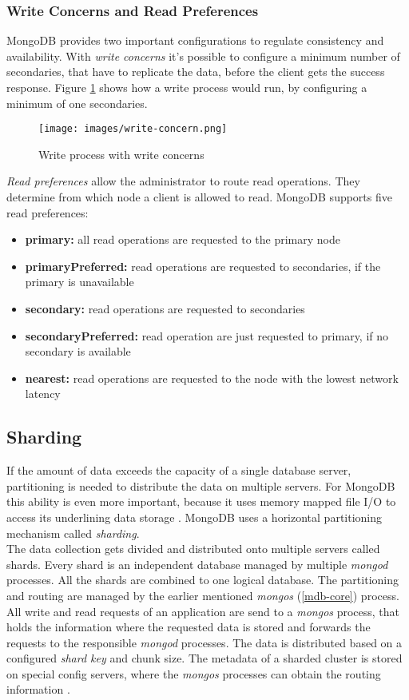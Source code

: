 \subsubsection{Write Concerns and Read Preferences}\label{read-write}
MongoDB provides two important configurations to regulate consistency and availability. With \textit{write concerns} it's possible to configure a minimum number of secondaries, that have to replicate the data, before the client gets the success response. Figure \ref{write-concerns} shows how a write process would run, by configuring a minimum of one secondaries.
\begin{figure}[H]
\texttt{[image: images/write-concern.png]}
\caption{Write process with write concerns}
\label{write-concerns}
\end{figure}
\textit{Read preferences} allow the administrator to route read operations. They determine from which node a client is allowed to read. MongoDB supports five read preferences:
\begin{itemize}
  \item \textbf{primary:} all read operations are requested to the primary node
  \item \textbf{primaryPreferred:} read operations are requested to secondaries, if the primary is unavailable
  \item \textbf{secondary:} read operations are requested to secondaries
  \item \textbf{secondaryPreferred:} read operation are just requested to primary, if no secondary is available
  \item \textbf{nearest:} read operations are requested to the node with the lowest network latency
\end{itemize}
\cite{mdbdocu}
\subsection{Sharding}\label{mdb-sharding}
If the amount of data exceeds the capacity of a single database server, partitioning is needed to distribute the data on multiple servers. For MongoDB this ability is even more important, because it uses memory mapped file I/O to access its underlining data storage \cite{Hows2013}. MongoDB uses a horizontal partitioning mechanism called \textit{sharding}.\\
The data collection gets divided and distributed onto multiple servers called shards. Every shard is an independent database managed by multiple \textit{mongod} processes. All the shards are combined to one logical database. The partitioning and routing are managed by the earlier mentioned \textit{mongos} (\ref{mdb-core}) process. All write and read requests of an application are send to a \textit{mongos} process, that holds the information where the requested data is stored and forwards the requests to the responsible \textit{mongod} processes. The data is distributed based on a configured \textit{shard key} and chunk size. The metadata of a sharded cluster is stored on special config servers, where the \textit{mongos} processes can obtain the routing information \cite{Edward2015,Hows2013}.

